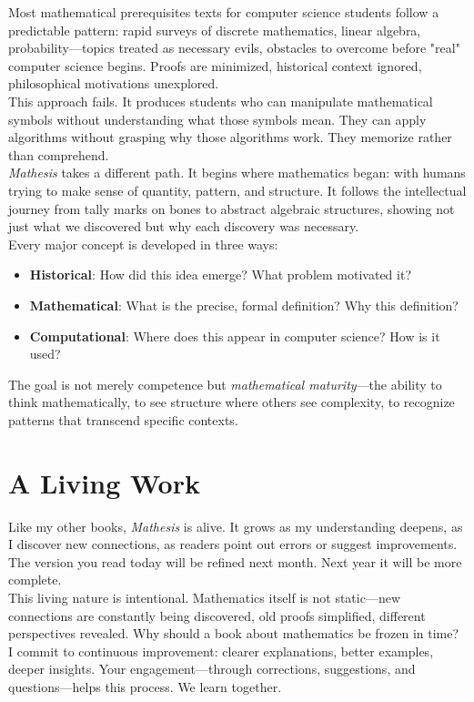 Most mathematical prerequisites texts for computer science students follow a predictable pattern: rapid surveys of discrete mathematics, linear algebra, probability—topics treated as necessary evils, obstacles to overcome before "real" computer science begins. Proofs are minimized, historical context ignored, philosophical motivations unexplored.\\
This approach fails. It produces students who can manipulate mathematical symbols without understanding what those symbols mean. They can apply algorithms without grasping why those algorithms work. They memorize rather than comprehend.\\
\textit{Mathesis} takes a different path. It begins where mathematics began: with humans trying to make sense of quantity, pattern, and structure. It follows the intellectual journey from tally marks on bones to abstract algebraic structures, showing not just what we discovered but why each discovery was necessary.\\
Every major concept is developed in three ways:
\begin{itemize}
    \item \textbf{Historical}: How did this idea emerge? What problem motivated it?
    \item \textbf{Mathematical}: What is the precise, formal definition? Why this definition?
    \item \textbf{Computational}: Where does this appear in computer science? How is it used?
\end{itemize}
The goal is not merely competence but \textit{mathematical maturity}—the ability to think mathematically, to see structure where others see complexity, to recognize patterns that transcend specific contexts.

\section*{A Living Work}

Like my other books, \textit{Mathesis} is alive. It grows as my understanding deepens, as I discover new connections, as readers point out errors or suggest improvements. The version you read today will be refined next month. Next year it will be more complete.\\
This living nature is intentional. Mathematics itself is not static—new connections are constantly being discovered, old proofs simplified, different perspectives revealed. Why should a book about mathematics be frozen in time?\\
I commit to continuous improvement: clearer explanations, better examples, deeper insights. Your engagement—through corrections, suggestions, and questions—helps this process. We learn together.

